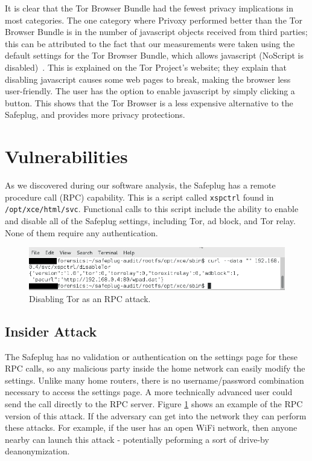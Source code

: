 \documentclass[letterpaper,twocolumn,10pt]{article}
\begin{document}
It is clear that the Tor Browser Bundle had the fewest privacy implications in most categories. The one category where Privoxy performed better than the Tor Browser Bundle is in the number of javascript objects received from third parties; this can be attributed to the fact that our measurements were taken using the default settings for the Tor Browser Bundle, which allows javascript (NoScript is disabled)~\cite{torproject}.  This is explained on the Tor Project's website; they explain that disabling javascript causes some web pages to break, making the browser less user-friendly.  The user has the option to enable javascript by simply clicking a button.  This shows that the Tor Browser is a less expensive alternative to the Safeplug, and provides more privacy protections.    

\section{Vulnerabilities}
As we discovered during our software analysis, the Safeplug has a remote procedure call (RPC) capability.  This is a script called \verb!xspctrl! found in \verb!/opt/xce/html/svc!.  Functional calls to this script include the ability to enable and disable all of the Safeplug settings, including Tor, ad block, and Tor relay.  None of them require any authentication.

\begin{figure}
  \centering
  \includegraphics[width=.5\textwidth]{disabletor2}
  \caption{Disabling Tor as an RPC attack.}
  \label{disable}
\end{figure}

\subsection{Insider Attack}
The Safeplug has no validation or authentication on the settings page for these RPC calls, so any malicious party inside the home network can easily modify the settings.  Unlike many home routers, there is no username/password combination necessary to access the settings page.  A more technically advanced user could send the call directly to the RPC server.  Figure \ref{disable} shows an example of the RPC version of this attack.  If the adversary can get into the network they can perform these attacks.  For example, if the user has an open WiFi network, then anyone nearby can launch this attack - potentially peforming a sort of drive-by deanonymization. 
\end{document}
